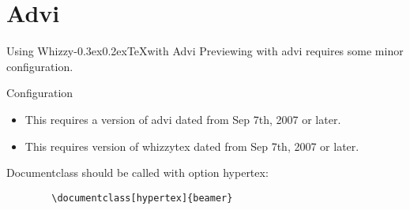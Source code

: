 \documentclass{beamer}
\makeatletter
\def \WhizzyTeX {{Whizzy\kern -0.3ex\raise 0.2ex\hbox{\let \@\relax\TeX}}}
\makeatother
\begin{document}
\section{Advi}
\begin{frame}{Using \WhizzyTeX with Advi}
Previewing with advi requires some minor configuration. 
\end{frame}
\begin{frame}[fragile=singleslide]{Configuration}
\begin{itemize}
\item This requires a version of advi  dated from Sep 7th, 2007 or later.
\item This requires version of whizzytex dated from Sep 7th, 2007 or later. 
\end{itemize}
Documentclass should be called with option hypertex:
\begin{verbatim}
        \documentclass[hypertex]{beamer}
\end{verbatim}
\end{frame}
\end{document}
